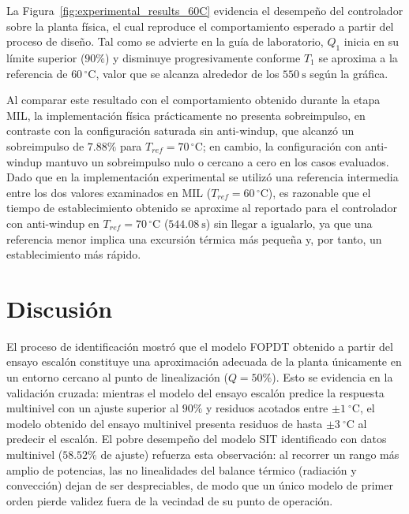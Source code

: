 \documentclass[journal]{IEEEtran}
\begin{document}
La Figura~\ref{fig:experimental_results_60C} evidencia el desempeño del controlador sobre la planta
física, el cual reproduce el comportamiento esperado a partir del proceso de diseño. Tal como se advierte
en la guía de laboratorio, $Q_1$ inicia en su límite superior ($90\%$) y disminuye progresivamente
conforme $T_1$ se aproxima a la referencia de $60\,^\circ\text{C}$, valor que se alcanza alrededor de
los $550~\mathrm{s}$ según la gráfica.

Al comparar este resultado con el comportamiento obtenido durante la etapa MIL, la implementación física
prácticamente no presenta sobreimpulso, en contraste con la configuración saturada sin anti-windup, que
alcanzó un sobreimpulso de $7.88\%$ para $T_{ref}=70\,^\circ\text{C}$; en cambio, la configuración con
anti-windup mantuvo un sobreimpulso nulo o cercano a cero en los casos evaluados. Dado que en la
implementación experimental se utilizó una referencia intermedia entre los dos valores examinados en MIL
($T_{ref}=60\,^\circ\text{C}$), es razonable que el tiempo de establecimiento obtenido se aproxime al
reportado para el controlador con anti-windup en $T_{ref}=70\,^\circ\text{C}$
($544.08~\mathrm{s}$) sin llegar a igualarlo, ya que una referencia menor implica una excursión térmica
más pequeña y, por tanto, un establecimiento más rápido. %


\section{Discusión}
El proceso de identificación mostró que el modelo FOPDT obtenido a partir del ensayo escalón
constituye una aproximación adecuada de la planta únicamente en un entorno cercano al punto de
linealización ($Q=50\%$). Esto se evidencia en la validación cruzada: mientras el modelo del ensayo
escalón predice la respuesta multinivel con un ajuste superior al $90\%$ y residuos acotados entre
$\pm1~^\circ$C, el modelo obtenido del ensayo multinivel presenta residuos de hasta $\pm3~^\circ$C
al predecir el escalón. El pobre desempeño del modelo SIT identificado con datos multinivel
($58.52\%$ de ajuste) refuerza esta observación: al recorrer un rango más amplio de potencias, las
no linealidades del balance térmico (radiación y convección) dejan de ser despreciables, de modo que
un único modelo de primer orden pierde validez fuera de la vecindad de su punto de operación.
\end{document}

